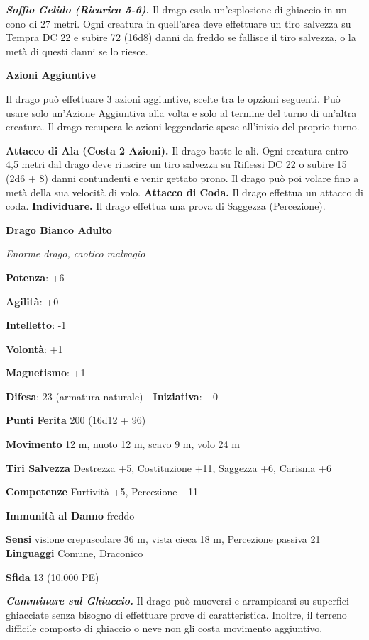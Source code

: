 \begin{multicols}{2}
\emph{\textbf{Soffio Gelido (Ricarica 5-6).}} Il drago esala
un'esplosione di ghiaccio in un cono di 27 metri. Ogni creatura in
quell'area deve effettuare un tiro salvezza su Tempra DC 22 e
subire 72 (16d8) danni da freddo se fallisce il tiro salvezza, o la metà
di questi danni se lo riesce.

\textbf{Azioni Aggiuntive}

Il drago può effettuare 3 azioni aggiuntive, scelte tra le opzioni
seguenti. Può usare solo un'Azione Aggiuntiva alla volta e solo al
termine del turno di un'altra creatura. Il drago recupera le azioni
leggendarie spese all'inizio del proprio turno.

\textbf{Attacco di Ala (Costa 2 Azioni).} Il drago batte le ali. Ogni
creatura entro 4,5 metri dal drago deve riuscire un tiro salvezza su Riflessi DC 22 o subire 15 (2d6 + 8) danni contundenti e venir gettato
prono. Il drago può poi volare fino a metà della sua velocità di volo.
\textbf{Attacco di Coda.} Il drago effettua un attacco di coda.
\textbf{Individuare.} Il drago effettua una prova di Saggezza
(Percezione).

\textbf{Drago Bianco Adulto}

\emph{Enorme drago, caotico malvagio}

\textbf{Potenza}: +6

\textbf{Agilità}: +0

\textbf{Intelletto}: -1

\textbf{Volontà}: +1

\textbf{Magnetismo}: +1

\textbf{Difesa}: 23 (armatura naturale) - \textbf{Iniziativa}: +0

\textbf{Punti Ferita} 200 (16d12 + 96)

\textbf{Movimento} 12 m, nuoto 12 m, scavo 9 m, volo 24 m

\textbf{Tiri Salvezza} Destrezza +5, Costituzione +11, Saggezza +6,
Carisma +6

\textbf{Competenze} Furtività +5, Percezione +11

\textbf{Immunità al Danno} freddo

\textbf{Sensi} visione crepuscolare 36 m, vista cieca 18 m, Percezione passiva
21 \textbf{Linguaggi} Comune, Draconico

\textbf{Sfida} 13 (10.000 PE)

\emph{\textbf{Camminare sul Ghiaccio.}} Il drago può muoversi e
arrampicarsi su superfici ghiacciate senza bisogno di effettuare prove
di caratteristica. Inoltre, il terreno difficile composto di ghiaccio o
neve non gli costa movimento aggiuntivo.


\end{multicols}

